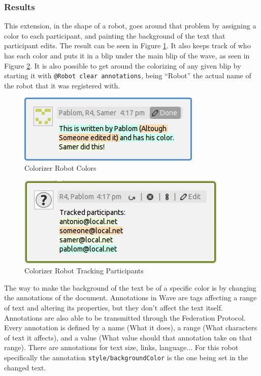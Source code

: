 \subsubsection{Results}
This extension, in the shape of a robot, goes around that problem by assigning a color to each participant, and painting the background of the text that participant edits. The result can be seen in Figure \ref{fig:colorizer_editions}. It also keeps track of who has each color and puts it in a blip under the main blip of the wave, as seen in Figure \ref{fig:colorizer_editors}. It is also possible to get around the colorizing of any given blip by starting it with \verb|@Robot clear annotations|, being ``Robot'' the actual name of the robot that it was registered with.\\[.2cm]
\begin{figure}[H]
  \center
    \includegraphics[keepaspectratio, scale=0.8]{Media/Captures/Extensions/Colorizer/ColorizerEditions.png}
  \caption{Colorizer Robot Colors}
  \label{fig:colorizer_editions}
\end{figure}
\begin{figure}[h]
  \center
    \includegraphics[keepaspectratio, scale=0.7]{Media/Captures/Extensions/Colorizer/ColorizerEditors.png}
  \caption{Colorizer Robot Tracking Participants}
  \label{fig:colorizer_editors}
\end{figure}
The way to make the background of the text be of a specific color is by changing the annotations of the document. Annotations in Wave are tags affecting a range of text and altering its properties, but they don't affect the text itself. Annotations are also able to be transmitted through the Federation Protocol. Every annotation is defined by a name (What it does), a range (What characters of text it affects), and a value (What value should that annotation take on that range). There are annotations for text size, links, language... For this robot specifically the annotation \verb|style/backgroundColor| is the one being set in the changed text.\\[.2cm]
